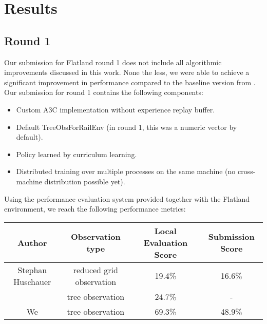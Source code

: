%
%

\chapter{Results}\label{chap.resultate}
\section{Round 1}
Our submission for Flatland round 1 does not include all algorithmic improvements discussed in this work. None the less, we were able to achieve a significant improvement in performance compared to the baseline version from \cite{flatlandstephan}.
Our submission for round 1 contains the following components:
\begin{itemize}
	\item Custom A3C implementation without experience replay buffer.
	\item Default TreeObsForRailEnv (in round 1, this was a numeric vector by default).
	\item Policy learned by curriculum learning.
	\item Distributed training over multiple processes on the same machine (no cross-machine distribution possible yet).
\end{itemize}
Using the performance evaluation system provided together with the Flatland environment, we reach the following performance metrics:

\begin{tabular}{ |c|c|c|c| } 
	\hline
	\textbf{Author} & \textbf{Observation type} & \textbf{Local Evaluation Score} & \textbf{Submission Score} \\
	\hline
	Stephan Huschauer & reduced grid observation & 19.4\% & 16.6\% \\
	& tree observation & 24.7\% & - \\
	We & tree observation & 69.3\% & 48.9\% \\
	\hline
\end{tabular}
